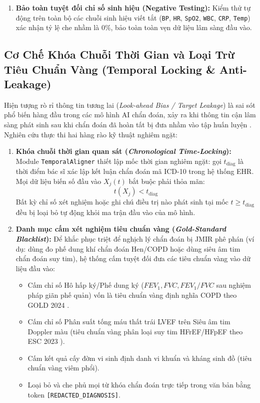 \begin{enumerate}[leftmargin=1.8em, itemsep=0.2em]
    \item \textbf{Bảo toàn tuyệt đối chỉ số sinh hiệu (Negative Testing):} Kiểm thử tự động trên toàn bộ các chuỗi sinh hiệu viết tắt (\texttt{BP}, \texttt{HR}, \texttt{SpO2}, \texttt{WBC}, \texttt{CRP}, \texttt{Temp}) xác nhận tỷ lệ che nhầm là $0\%$, bảo toàn toàn vẹn dữ liệu lâm sàng đầu vào.
\end{enumerate}

\subsection{Cơ Chế Khóa Chuỗi Thời Gian và Loại Trừ Tiêu Chuẩn Vàng (Temporal Locking \& Anti-Leakage)}
Hiện tượng rò rỉ thông tin tương lai (\textit{Look-ahead Bias / Target Leakage}) là sai sót phổ biến hàng đầu trong các mô hình AI chẩn đoán, xảy ra khi thông tin cận lâm sàng phát sinh sau khi chẩn đoán đã hoàn tất bị đưa nhầm vào tập huấn luyện \cite{kapoor2023leakage,hunik2024diagnostic}. Nghiên cứu thực thi hai hàng rào kỹ thuật nghiêm ngặt:
\begin{enumerate}[leftmargin=1.8em, itemsep=0.2em]
    \item \textbf{Khóa chuỗi thời gian quan sát (\textit{Chronological Time-Locking}):} Module \texttt{TemporalAligner} thiết lập mốc thời gian nghiêm ngặt: gọi $t_{\text{diag}}$ là thời điểm bác sĩ xác lập kết luận chẩn đoán mã ICD-10 trong hệ thống EHR. Mọi dữ liệu biến số đầu vào $X_j(t)$ bắt buộc phải thỏa mãn:
    \begin{equation}
        t(X_j) < t_{\text{diag}}
    \end{equation}
    Bất kỳ chỉ số xét nghiệm hoặc ghi chú điều trị nào phát sinh tại mốc $t \ge t_{\text{diag}}$ đều bị loại bỏ tự động khỏi ma trận đầu vào của mô hình.
    \item \textbf{Danh mục cấm xét nghiệm tiêu chuẩn vàng (\textit{Gold-Standard Blacklist}):} Để khắc phục triệt để nghịch lý chẩn đoán bị JMIR phê phán (ví dụ: dùng đo phế dung khí chẩn đoán Hen/COPD hoặc dùng siêu âm tim chẩn đoán suy tim), hệ thống cấm tuyệt đối đưa các tiêu chuẩn vàng vào dữ liệu đầu vào:
    \begin{itemize}[leftmargin=1.5em, itemsep=0.1em]
        \item Cấm chỉ số Hô hấp ký/Phế dung ký ($FEV_1, FVC, FEV_1/FVC$ sau nghiệm pháp giãn phế quản) vốn là tiêu chuẩn vàng định nghĩa COPD theo GOLD 2024 \cite{gold2024copd}.
        \item Cấm chỉ số Phân suất tống máu thất trái LVEF trên Siêu âm tim Doppler màu (tiêu chuẩn vàng phân loại suy tim HFrEF/HFpEF theo ESC 2023 \cite{mcdonagh2023esc}).
        \item Cấm kết quả cấy đờm vi sinh định danh vi khuẩn và kháng sinh đồ (tiêu chuẩn vàng viêm phổi).
        \item Loại bỏ và che phủ mọi từ khóa chẩn đoán trực tiếp trong văn bản bằng token \texttt{[REDACTED\_DIAGNOSIS]}.
    \end{itemize}
\end{enumerate}

